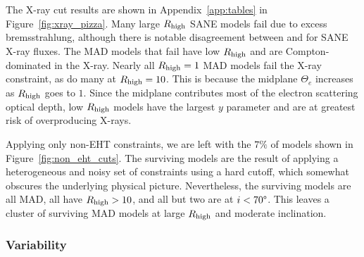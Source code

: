 The X-ray cut results are shown in Appendix~\ref{app:tables} in Figure~\ref{fig:xray_pizza}.  Many large $R_\mathrm{high}$ SANE models fail due to excess bremsstrahlung, although there is notable disagreement between \bhac and \kharma for SANE X-ray fluxes.
The MAD models that fail have low $R_\mathrm{high}$ and are Compton-dominated in the X-ray.
Nearly all $R_\mathrm{high} = 1$ MAD models fail the X-ray constraint, as do many at $R_\mathrm{high} = 10$.  This is because the midplane $\Theta_e$ increases as $R_\mathrm{high}$ goes to $1$.
Since the midplane contributes most of the electron scattering optical depth, low $R_\mathrm{high}$ models have the largest $y$ parameter and are at greatest risk of overproducing X-rays.


Applying only non-EHT constraints, we are left with the $7\%$ of models shown in Figure~\ref{fig:non_eht_cuts}.
The surviving models are the result of applying a heterogeneous and noisy set of constraints using a hard cutoff, which somewhat obscures the underlying physical picture.
Nevertheless, the surviving models are all MAD, all have $R_\mathrm{high} > 10$, and all but two are at $i < 70\degree$.
This leaves a cluster of surviving MAD models at large $R_\mathrm{high}$ and moderate inclination.

\subsubsection{Variability}

